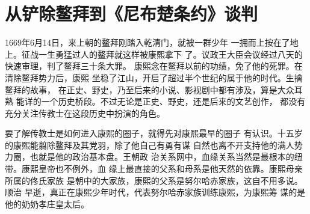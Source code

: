 \section{从铲除鳌拜到《尼布楚条约》谈判}
\par
1669年6月14日，来上朝的鳌拜刚踏入乾清门，就被一群少年%
一拥而上按在了地上。征战一生勇猛过人的鳌拜就这样被康熙拿下%
了。议政王大臣会议经过八天的快速审理，判了鳌拜三十条大罪。%
康熙念在鳌拜以前的功绩，免了他的死罪。在清除鳌拜势力后，康熙%
坐稳了江山，开启了超过半个世纪的属于他的时代。生擒鳌拜的故事，%
在正史、野史，乃至后来的小说、影视剧中都有涉及，算是大众耳熟%
能详的一个历史桥段。不过无论是正史、野史，还是后来的文艺创作，%
都没有充分关注传教士在这段历史中扮演的角色。%
\par
要了解传教士是如何进入康熙的圈子，就得先对康熙最早的圈子%
有认识。十五岁的康熙能翦除鳌拜及其党羽，除了他自己有勇有谋%
自然也离不开支持他的满人势力圈，也就是他的政治基本盘。王朝政%
治关系网中，血缘关系当然是最根本的纽带。康熙皇帝也不例外，血%
缘上最直接的父系和母系是他天然的依靠。康熙母亲所属的佟氏家族%
是朝中的大家族，康熙的父系是努尔哈赤家族，这自不用多说。顺治%
早逝，真正在康熙少年时代，代表努尔哈赤家族训练康熙，为康熙筹%
谋的是他的奶奶孝庄皇太后。%
